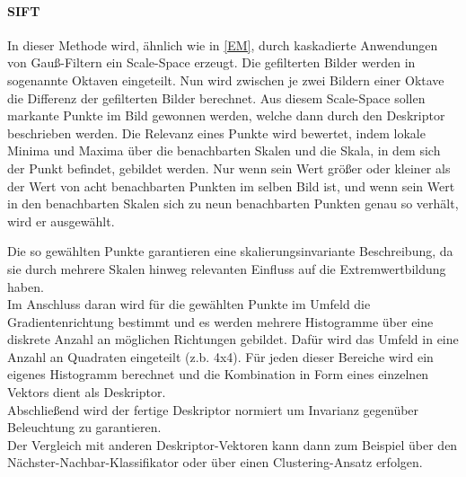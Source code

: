 \documentclass[12pt]{article}
\begin{document}
\paragraph{SIFT \cite{sift}}
In dieser Methode wird, ähnlich wie in \ref{EM}, durch kaskadierte Anwendungen von Gauß-Filtern ein Scale-Space erzeugt. Die gefilterten Bilder werden in sogenannte Oktaven eingeteilt. Nun wird zwischen je zwei Bildern einer Oktave die Differenz der gefilterten Bilder berechnet. 
Aus diesem Scale-Space sollen markante Punkte im Bild gewonnen werden, welche dann durch den Deskriptor beschrieben werden. Die Relevanz eines Punkte wird bewertet, indem lokale Minima und Maxima über die benachbarten Skalen und die Skala, in dem sich der Punkt befindet, gebildet werden. Nur wenn sein Wert größer oder kleiner als der Wert von acht benachbarten Punkten im selben Bild ist, und wenn sein Wert in den benachbarten Skalen sich zu neun benachbarten Punkten genau so verhält, wird er ausgewählt. 

Die so gewählten Punkte garantieren eine skalierungsinvariante Beschreibung, da sie durch mehrere Skalen hinweg relevanten Einfluss auf die Extremwertbildung haben.\\
Im Anschluss daran wird für die gewählten Punkte im Umfeld die Gradientenrichtung bestimmt und es werden mehrere Histogramme über eine diskrete Anzahl an möglichen Richtungen gebildet. Dafür wird das Umfeld in eine Anzahl an Quadraten eingeteilt (z.b. 4x4). Für jeden dieser Bereiche wird ein eigenes Histogramm berechnet und die Kombination in Form eines einzelnen Vektors dient als Deskriptor.\\
Abschließend wird der fertige Deskriptor normiert um Invarianz gegenüber Beleuchtung zu garantieren.\\

Der Vergleich mit anderen Deskriptor-Vektoren kann dann zum Beispiel über den Nächster-Nachbar-Klassifikator oder über einen Clustering-Ansatz erfolgen.
\end{document}
